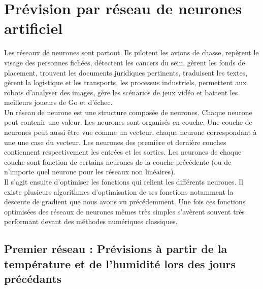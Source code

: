 \documentclass[11pt,a4paper]{article}
\begin{document}
\section {Prévision par réseau de neurones artificiel}

Les réseaux de neurones sont partout. Ils pilotent les avions de chasse, repèrent le visage des personnes fichées, détectent les cancers du sein, gèrent les fonds de placement, trouvent les documents juridiques pertinents, traduisent les textes, gèrent la logistique et les transports, les processus industriels, permettent aux robots d'analyser des images, gère les scénarios de jeux vidéo et battent les meilleurs joueurs de Go et d'échec.   \\
Un réseau de neurone est une structure composée de neurones. Chaque neurone peut contenir une valeur. Les neurones sont organisés en couche. Une couche de neurones peut aussi être vue comme un vecteur, chaque neurone correspondant à une une case du vecteur. Les neurones des première et dernière couches contiennent respectivement les entrées et les sorties. Les neurones de chaque couche sont fonction de certains neurones de la couche précédente (ou de n'importe quel neurone pour les réseaux non linéaires). \\
Il s'agit ensuite d'optimiser les fonctions qui relient les différents neurones. Il existe plusieurs algorithmes d'optimisation de ses fonctions notamment la descente de gradient que nous avons vu précédemment. Une fois ces fonctions optimisées des réseaux de neurones mêmes très simples s'avèrent souvent très performant devant des méthodes numériques classiques. \\

\subsection {Premier réseau : Prévisions à partir de la température et de l'humidité lors des jours précédants}
\end{document}

